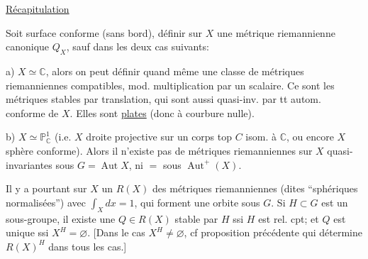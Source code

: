 \uline{Récapitulation}

Soit  surface conforme (sans bord),  définir sur $X$ une métrique riemannienne canonique $Q_X$, sauf dans les deux cas suivants:

a) $X\simeq\mathbb C$, alors on peut définir quand même une classe de métriques riemanniennes compatibles, mod. multiplication par un scalaire. Ce sont les métriques stables par translation, qui sont aussi quasi-inv. par tt autom. conforme de $X$. Elles sont \uline{plates} (donc à courbure nulle).

b) $X\simeq\mathbb P^1_{\mathbb C}$ (i.e. $X$ droite projective sur un corps top $C$ isom. à $\mathbb C$, ou encore $X$ sphère conforme). Alors il n'existe pas de métriques riemanniennes sur $X$ quasi-invariantes sous $G=\operatorname{Aut}X$, ni $=$ sous $\operatorname{Aut}^+(X)$.

 Il y a pourtant sur $X$ un  $R(X)$ des métriques riemanniennes (dites ``sphériques normalisées'') avec $\int_X dx=1$, qui forment une orbite sous $G$. Si $H\subset G$ est un sous-groupe, il existe une $Q\in R(X)$ stable par $H$ ssi $H$ est rel. cpt; et $Q$ est unique ssi $X^H=\varnothing$. [Dans le cas $X^H\ne\varnothing$, cf proposition précédente qui détermine $R(X)^H$ dans tous les cas.]

